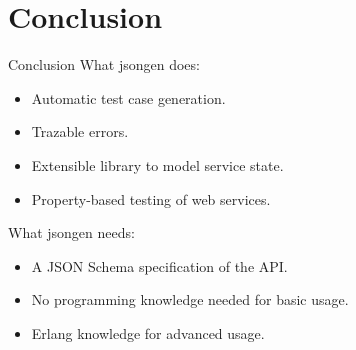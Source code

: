 \section{Conclusion}

\begin{frame}{Conclusion}
  What jsongen does:
\begin{itemize}
\item Automatic test case generation.
\item Trazable errors.
\item Extensible library to model service state.
\item Property-based testing of web services.
\end{itemize}

What jsongen needs:
  \begin{itemize}
    \item A JSON Schema specification of the API.
    \item No programming knowledge needed for basic usage.
    \item Erlang knowledge for advanced usage.
  \end{itemize}
\end{frame}
